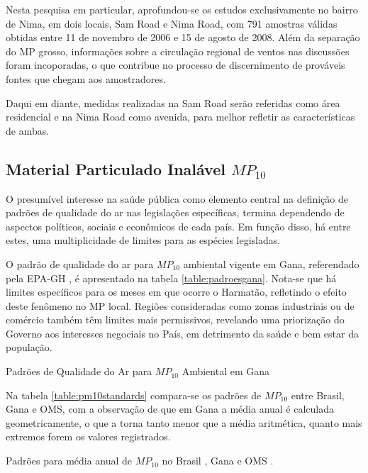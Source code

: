 Nesta pesquisa em particular, aprofundou-se os estudos exclusivamente no bairro
de Nima, em dois locais, Sam Road e Nima Road, com 791 amostras válidas obtidas
entre 11 de novembro de 2006 e 15 de agosto de 2008. Além da separação do MP 
grosso, informações sobre a circulação regional de ventos nas discussões foram 
incoporadas, o que contribue no processo de discernimento de prováveis fontes 
que chegam aos amostradores.

Daqui em diante, medidas realizadas na Sam Road serão referidas como área 
residencial e na Nima Road como avenida, para melhor refletir as características
de ambas.

\subsection{Material Particulado Inalável $MP_{10}$}

O presumível interesse na saúde pública como elemento central na definição de 
padrões de qualidade do ar nas legislações específicas, termina dependendo de
aspectos políticos, sociais e econômicos de cada país. Em função disso, há entre
estes, uma multiplicidade de limites para as espécies legisladas.

O padrão de qualidade do ar para $MP_{10}$ ambiental vigente em Gana, referendado
pela EPA-GH \citeyearpar{epa2015}, é apresentado na tabela 
\ref{table:padroesgana}. Nota-se que há limites específicos para os meses em que 
ocorre o Harmatão, refletindo o efeito deste fenômeno no MP local. 
Regiões consideradas como zonas industriais ou de comércio também têm limites 
mais permissivos, revelando uma priorização do Governo aos interesses negociais
no País, em detrimento da saúde e bem estar da população.

\begin{table}[H]
\centering
  
\caption{Padrões de Qualidade do Ar para $MP_{10}$ Ambiental em Gana
         \cite{epa2015} \label{table:padroesgana}}
\end{table}

Na tabela \ref{table:pm10standards} compara-se os padrões de $MP_{10}$ entre 
Brasil, Gana e OMS, com a observação de que em Gana a média anual é calculada 
geometricamente, o que a torna tanto menor que a média aritmética, quanto 
mais extremos forem os valores registrados.

\begin{table}[H]
\centering
  
  \caption{Padrões para média anual de $MP_{10}$ no Brasil \citep{conama1990}, 
           Gana \citep{epa2015} e OMS \citep{who}. \label{table:pm10standards}}
\end{table}

